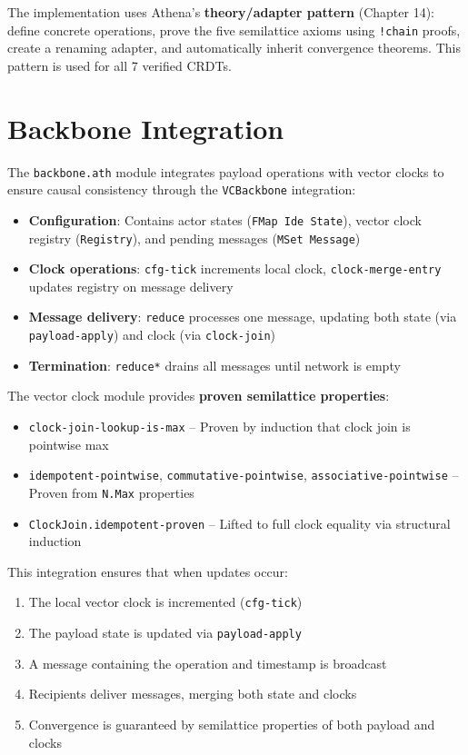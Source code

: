 The implementation uses Athena's \textbf{theory/adapter pattern} (Chapter 14): define concrete operations, prove the five semilattice axioms using \texttt{!chain} proofs, create a renaming adapter, and automatically inherit convergence theorems. This pattern is used for all 7 verified CRDTs.

\section{Backbone Integration}

The \texttt{backbone.ath} module integrates payload operations with vector clocks to ensure causal consistency through the \texttt{VCBackbone} integration:

\begin{itemize}
  \item \textbf{Configuration}: Contains actor states (\texttt{FMap Ide State}), vector clock registry (\texttt{Registry}), and pending messages (\texttt{MSet Message})
  \item \textbf{Clock operations}: \texttt{cfg-tick} increments local clock, \texttt{clock-merge-entry} updates registry on message delivery
  \item \textbf{Message delivery}: \texttt{reduce} processes one message, updating both state (via \texttt{payload-apply}) and clock (via \texttt{clock-join})
  \item \textbf{Termination}: \texttt{reduce*} drains all messages until network is empty
\end{itemize}

The vector clock module provides \textbf{proven semilattice properties}:

\begin{itemize}
  \item \texttt{clock-join-lookup-is-max} -- Proven by induction that clock join is pointwise max
  \item \texttt{idempotent-pointwise}, \texttt{commutative-pointwise}, \texttt{associative-pointwise} -- Proven from \texttt{N.Max} properties
  \item \texttt{ClockJoin.idempotent-proven} -- Lifted to full clock equality via structural induction
\end{itemize}

This integration ensures that when updates occur:

\begin{enumerate}
  \item The local vector clock is incremented (\texttt{cfg-tick})
  \item The payload state is updated via \texttt{payload-apply}
  \item A message containing the operation and timestamp is broadcast
  \item Recipients deliver messages, merging both state and clocks
  \item Convergence is guaranteed by semilattice properties of both payload and clocks
\end{enumerate}

